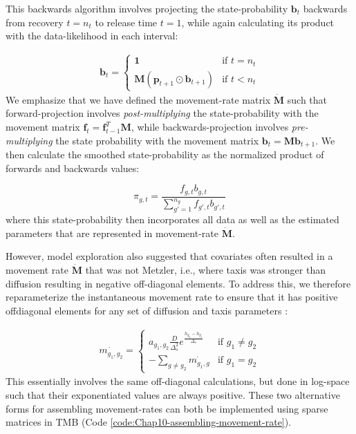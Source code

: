 \begin{itemize}
    This backwards algorithm involves projecting the state-probability \( \mathbf{b}_{t} \) backwards from recovery \(t=n_t\) to release time \(t=1\), while again calculating its product with the data-likelihood in each interval:

    \begin{equation}
    \begin{gathered}
        \mathbf{b}_{t} = 
        \begin{cases}
            \mathbf{1}  & \text{if } t = n_t \\  
            \mathbf{M} (\mathbf{p}_{t+1} \odot \mathbf{b}_{t+1})  & \text{if } t < n_t   
        \end{cases}
    \end{gathered}     
    \end{equation}
    We emphasize that we have defined the movement-rate matrix \( \dot{\mathbf{M}} \) such that forward-projection involves \textit{post-multiplying} the state-probability with the movement matrix \( \mathbf{f}_{t} = \mathbf{f}_{t-1}^T \mathbf{M} \), while backwards-projection involves \textit{pre-multiplying} the state probability with the movement matrix \( \mathbf{b}_{t} = \mathbf{M} \mathbf{b}_{t+1} \).  We then calculate the smoothed state-probability as the normalized product of forwards and backwards values:
    
    \begin{equation}
        \pi_{g,t} = \frac{f_{g,t} b_{g,t}}{\sum_{g'=1}^{n_g} f_{g',t} b_{g',t} }
    \end{equation}
    where this state-probability then incorporates all data as well as the estimated parameters that are represented in movement-rate \( \dot{\mathbf{M}} \).  
\end{itemize}

However, model exploration also suggested that covariates often resulted in a movement rate \( \dot{\mathbf{M}} \) that was not Metzler, i.e., where taxis was stronger than diffusion resulting in negative off-diagonal elements.  To address this, we therefore  reparameterize the instantaneous movement rate to ensure that it has  positive offdiagonal elements for any set of diffusion and taxis parameters \cite{hanks_continuous-time_2015}:   

\begin{equation}
\begin{gathered} \label{eq:Chap10_taxis2}
  \dot{m_{g_1,g_2}} = 
  \begin{cases}
    a_{g_1,g_2} \frac{D}{\Delta_s^2} e^{\frac{h_{g_2} - h_{g_1}}{\Delta_s}} & \text{if } g_1 \neq g_2  \\ 
    -\sum_{g \neq g_2} \dot{m_{g_1,g}} & \text{if } g_1 = g_2 
  \end{cases}
\end{gathered}
\end{equation}
This essentially involves the same off-diagonal calculations, but done in log-space such that their exponentiated values are always positive.  These two alternative forms for assembling movement-rates can both be implemented using sparse matrices in TMB (Code \ref{code:Chap10-assembling-movement-rate}).

